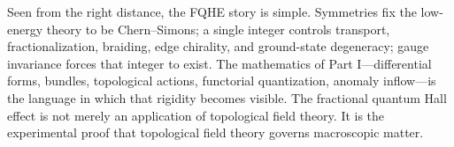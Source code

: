 \medskip

Seen from the right distance, the FQHE story is simple. Symmetries fix the low-energy theory to be Chern--Simons; a single integer controls transport, fractionalization, braiding, edge chirality, and ground-state degeneracy; gauge invariance forces that integer to exist. The mathematics of Part I---differential forms, bundles, topological actions, functorial quantization, anomaly inflow---is the language in which that rigidity becomes visible. The fractional quantum Hall effect is not merely an application of topological field theory. It is the experimental proof that topological field theory governs macroscopic matter.

